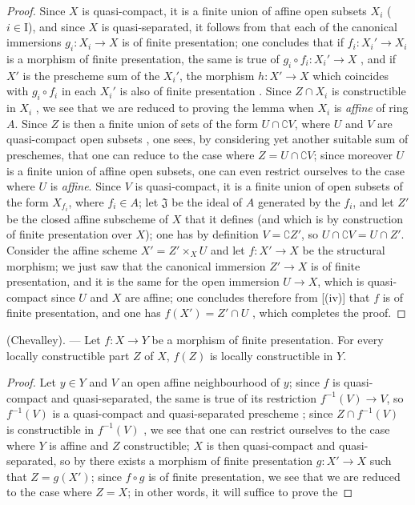 \begin{proof}
Since $X$ is quasi-compact, it is a finite union of affine open subsets $X_i$ ($i\in\mathrm{I}$), and since $X$ is quasi-separated, it follows from  that each of the canonical immersions $g_i:X_i\to X$ is of finite presentation; one concludes that if $f_i:X_i'\to X_i$ is a morphism of finite presentation, the same is true of $g_i\circ f_i:X_i'\to X$ , and if $X'$ is the prescheme sum of the $X_i'$, the morphism $h:X'\to X$ which coincides with $g_i\circ f_i$ in each $X_i'$ is also of finite presentation .
Since $Z\cap X_i$ is constructible in $X_i$ , we see that we are reduced to proving the lemma when $X_i$ is \emph{affine} of ring $A$.
Since $Z$ is then a finite union of sets of the form $U\cap\complement V$, where $U$ and $V$ are
quasi-compact open subsets , one sees, by considering yet another suitable sum of preschemes, that one can reduce to the case where $Z=U\cap\complement V$; since moreover $U$ is a finite union of affine open subsets, one can even restrict ourselves to the case where $U$ is \emph{affine}.
Since $V$ is quasi-compact, it is a finite union of open subsets of the form $X_{f_i}$, where $f_i\in A$; let $\mathfrak{J}$ be the ideal of $A$ generated by the $f_i$, and let $Z'$ be the closed affine subscheme of $X$ that it defines (and which is by construction of finite presentation over $X$); one has by definition $V=\complement Z'$, so $U\cap\complement V=U\cap Z'$.
Consider the affine scheme $X'=Z'\times_X U$
and let $f:X'\to X$ be the structural morphism; we just saw that the canonical immersion $Z'\to X$ is of finite presentation, and it is the same for the open immersion $U\to X$, which is quasi-compact since $U$ and $X$ are affine; one concludes therefore from [(iv)] that $f$ is of finite presentation, and one has $f(X')=Z'\cap U$ , which completes the proof.
\end{proof}

\begin{theorem}[1.8.4]
\label{IV.1.8.4}
\textup{(Chevalley).} ---
Let $f:X\to Y$ be a morphism of finite presentation.
For every locally constructible part $Z$ of $X$, $f(Z)$ is locally constructible in $Y$.
\end{theorem}

\begin{proof}
Let $y\in Y$ and $V$ an open affine neighbourhood of $y$; since $f$ is quasi-compact and quasi-separated, the same is true of its restriction $f^{-1}(V)\to V$, so $f^{-1}(V)$ is a quasi-compact and quasi-separated prescheme ; since $Z\cap f^{-1}(V)$ is constructible in $f^{-1}(V)$ , we see that one can restrict ourselves to the case where $Y$ is affine and $Z$ constructible; $X$ is then quasi-compact and quasi-separated, so by  there exists a morphism of finite presentation $g:X'\to X$ such that $Z=g(X')$; since $f\circ g$ is of finite presentation, we see that we are reduced to the case where $Z=X$; in other words, it will suffice to prove the
\end{proof}

